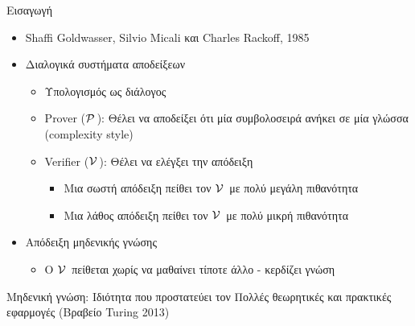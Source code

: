 \documentclass[10pt,handout]{beamer}
\begin{document}
\begin{frame}{Εισαγωγή}
\begin{itemize}
\item Shaffi Goldwasser, Silvio Micali και Charles Rackoff, 1985
\pause
\item Διαλογικά συστήματα αποδείξεων
\pause
\begin{itemize}
\item Υπολογισμός ως διάλογος
\pause
\item Prover ($\mathcal{P}\,$): Θέλει να αποδείξει ότι μία συμβολοσειρά ανήκει σε μία γλώσσα (complexity style)
\pause
\item Verifier ($\mathcal{V}\,$): Θέλει να ελέγξει την απόδειξη
\pause
\begin{itemize}
\item Μια σωστή απόδειξη πείθει τον $\mathcal{V}\,$ με πολύ μεγάλη πιθανότητα
\item Μια λάθος απόδειξη πείθει τον $\mathcal{V}\,$ με πολύ μικρή πιθανότητα
\end{itemize}
\end{itemize}
\item Απόδειξη μηδενικής γνώσης
\begin{itemize}
\item Ο $\mathcal{V}\,$ πείθεται χωρίς να μαθαίνει τίποτε άλλο - κερδίζει γνώση
\end{itemize}
\pause
\end{itemize}
\alert{Μηδενική γνώση:} Ιδιότητα που προστατεύει τον \prv
Πολλές θεωρητικές και πρακτικές εφαρμογές (Βραβείο Turing 2013)
\end{frame}
\end{document}
